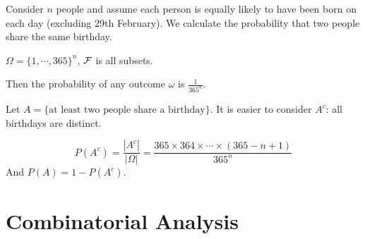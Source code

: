\documentclass[../Main.tex]{subfiles}
\begin{document}
\begin{example}
    Consider $n$ people and assume each person is equally likely to have been born on each day (excluding 29th February). We calculate the probability that two people share the same birthday.\par
    $\Omega = \{1, \cdots, 365\}^n$, $\mathcal{F}$ is all subsets.\par
    Then the probability of any outcome $\omega$ is $\frac{1}{365^n}$.\par
    Let $A = \{\text{at least two people share a birthday}\}$. It is easier to consider $A^c$: all birthdays are distinct.\par
    \begin{equation*}
        P(A^c) = \frac{|A^c|}{|\Omega|} = \frac{365 \times 364 \times \cdots \times (365-n + 1)}{365^n}
    \end{equation*}
    And $P(A) = 1 - P(A^c)$.
\end{example}
\section{Combinatorial Analysis}
\end{document}
